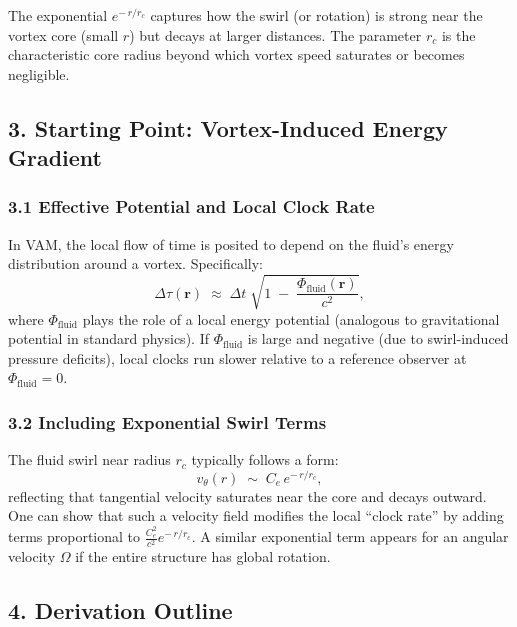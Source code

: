 \documentclass[aps,preprint,superscriptaddress]{revtex4-2}
\begin{document}
    The exponential \(e^{-\,r/r_c}\) captures how the swirl (or rotation) is strong near the vortex core (small \(r\)) but decays at larger distances. The parameter \(r_c\) is the characteristic core radius beyond which vortex speed saturates or becomes negligible.

    \subsection*{3. Starting Point: Vortex-Induced Energy Gradient}

    \subsubsection*{3.1 Effective Potential and Local Clock Rate}

    In VAM, the local flow of time is posited to depend on the fluid’s energy distribution around a vortex. Specifically:
    \[
        \Delta \tau(\mathbf{r})
        \;\approx\;
        \Delta t
        \;\sqrt{
            1
            \;-\;
            \frac{\Phi_{\mathrm{fluid}}(\mathbf{r})}{c^2}
        },
    \]
    where \(\Phi_{\mathrm{fluid}}\) plays the role of a local energy potential (analogous to gravitational potential in standard physics). If \(\Phi_{\mathrm{fluid}}\) is large and negative (due to swirl-induced pressure deficits), local clocks run slower relative to a reference observer at \(\Phi_{\mathrm{fluid}}=0\).

    \subsubsection*{3.2 Including Exponential Swirl Terms}

    The fluid swirl near radius \(r_c\) typically follows a form:
    \[
        v_{\theta}(r)
        \;\sim\;
        C_e \,e^{-\,r/r_c},
    \]
    reflecting that tangential velocity saturates near the core and decays outward. One can show that such a velocity field modifies the local “clock rate” by adding terms proportional to \(\tfrac{C_e^2}{c^2} e^{-\,r/r_c}\). A similar exponential term appears for an angular velocity \(\Omega\) if the entire structure has global rotation.

    \subsection*{4. Derivation Outline}
\end{document}
